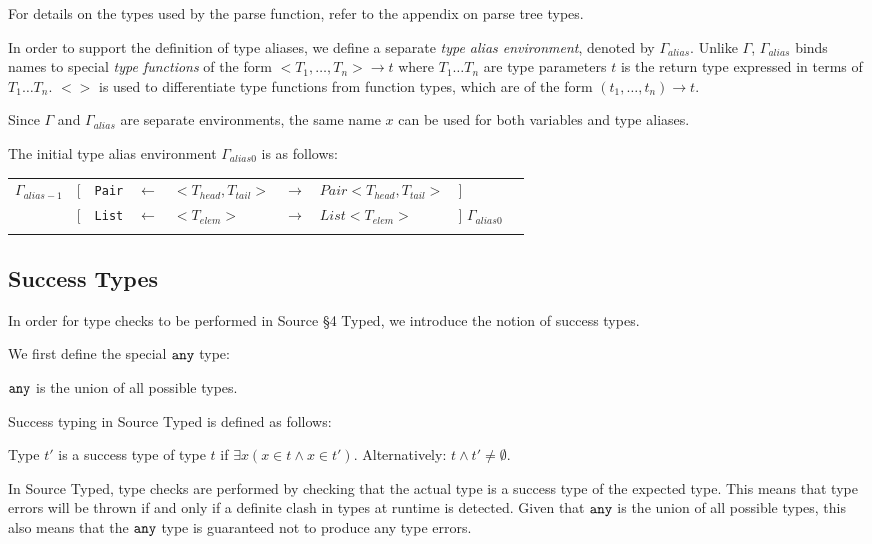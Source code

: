 For details on the types used by the parse function, refer to the appendix on parse tree types.

In order to support the definition of type aliases, we define a separate
\emph{type alias environment}, denoted by $\Gamma_{alias}$. Unlike $\Gamma$,
$\Gamma_{alias}$ binds names to special \emph{type functions} of the form $<T_1, \ldots, T_n> \rightarrow t$
where $T_1 \ldots T_n$ are type parameters $t$ is the return type expressed in terms of $T_1 \ldots T_n$.
$<>$ is used to differentiate type functions from function types, which are of the form $(t_1, \ldots, t_n) \rightarrow t$.

Since $\Gamma$ and $\Gamma_{alias}$ are separate environments, the same name $x$ can be used for both variables and type aliases.

The initial type alias environment $\Gamma_{alias0}$ is as follows:

\begin{tabular}[fragile]{lllllllll}
$\Gamma_{alias-1}$
& $[$ & \texttt{Pair} & $\leftarrow$ & $<T_{head}, T_{tail}>$ & $\rightarrow$ & $Pair<T_{head}, T_{tail}>$ & $]$ \\
& $[$ & \texttt{List} & $\leftarrow$ & $<T_{elem}>$ & $\rightarrow$ & $List<T_{elem}>$ & $]$ $\Gamma_{alias0}$ \\
& \end{tabular}

\subsection{Success Types}

In order for type checks to be performed in Source \S 4 Typed, we introduce the notion of success types.

We first define the special $\texttt{any}$ type:
\begin{definition}
$\texttt{any}$ is the union of all possible types.
\end{definition}

Success typing in Source Typed is defined as follows:

\begin{definition}
Type $t'$ is a success type of type $t$ if $\exists x (x \in t \wedge x \in t')$.
Alternatively: $t \wedge t' \neq \emptyset$.
\end{definition}

In Source Typed, type checks are performed by checking that the actual type is a success type of the expected type.
This means that type errors will be thrown if and only if a definite clash in types at runtime is detected.
Given that $\texttt{any}$ is the union of all possible types, this also means that the $\texttt{any}$ type is guaranteed not to produce any type errors.

